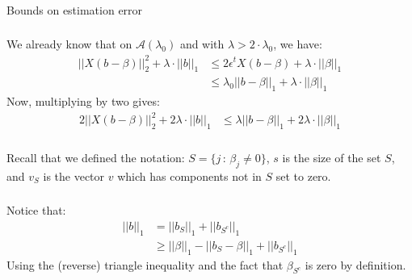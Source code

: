 \begin{frame}[fragile] \frametitle{}

\begin{flushright}
{\color{yaleblue}\sc\fontsize{1cm}{0cm}\selectfont Bounds on estimation error}
\end{flushright}

\end{frame}

\begin{frame}[fragile] \frametitle{}

We already know that on $\mathcal{A}(\lambda_0)$ and with $\lambda > 2 \cdot \lambda_0$, we have:
\begin{align*}
|| X (b - \beta) ||_2^2 + \lambda \cdot || b ||_1 &\leq 2 \epsilon^t X (b - \beta) + \lambda \cdot || \beta ||_1 \\
&\leq \lambda_0 || b - \beta ||_1 + \lambda \cdot || \beta ||_1
\end{align*}
\pause Now, multiplying by two gives:
\begin{align*}
2 || X (b - \beta) ||_2^2 + 2 \lambda \cdot || b ||_1
&\leq \lambda || b - \beta ||_1 + 2 \lambda \cdot || \beta ||_1
\end{align*}

\end{frame}

\begin{frame}[fragile] \frametitle{}

Recall that we defined the notation: $S = \{j \, : \, \beta_j \neq 0\}$, $s$
is the size of the set $S$, and $v_{S}$ is the vector
$v$ which has components not in $S$ set to zero.

\end{frame}

\begin{frame}[fragile] \frametitle{}

Notice that:
\begin{align*}
|| b ||_1 &= || b_S ||_1 + || b_{S^c} ||_1 \\
&\geq || \beta ||_1 - || b_S - \beta ||_1 + || b_{S^c} ||_1
\end{align*}
Using the (reverse) triangle inequality and the fact that $\beta_{S^c}$ is zero
by definition.

\end{frame}

